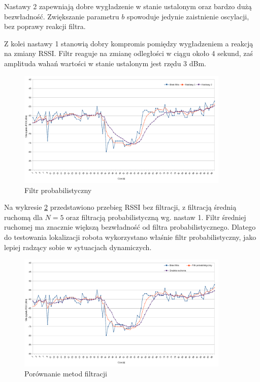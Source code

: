 Nastawy 2 zapewniają dobre wygładzenie w stanie ustalonym oraz bardzo dużą bezwładność. Zwiększanie parametru $b$ spowoduje jedynie zaistnienie oscylacji, bez poprawy reakcji filtra. 

Z kolei nastawy 1 stanowią dobry kompromis pomiędzy wygładzeniem a reakcją na zmiany RSSI. Filtr reaguje na zmianę odległości w ciągu około 4 sekund, zaś amplituda wahań wartości w stanie ustalonym jest rzędu 3 dBm. 
\begin{figure}[ht]
\centering
\includegraphics[width=0.9\textwidth]{img/filtr-propab.png}
\caption{Filtr probabilistyczny}
\label{fig:filtry-probab}
\end{figure}
Na wykresie \ref{fig:filtry-wszystkie} przedstawiono przebieg RSSI bez filtracji, z filtracją średnią ruchomą dla $N=5$ oraz filtracją probabilistyczną wg. nastaw 1. Filtr średniej ruchomej ma znacznie większą bezwładność od filtra probabilistycznego. Dlatego do testowania lokalizacji robota wykorzystano właśnie filtr probabilistyczny, jako lepiej radzący sobie w sytuacjach dynamiczych. 
\begin{figure}[H]
\centering
\includegraphics[width=0.9\textwidth]{img/filtry-porownanie.png}
\caption{Porównanie metod filtracji}
\label{fig:filtry-wszystkie}
\end{figure}

